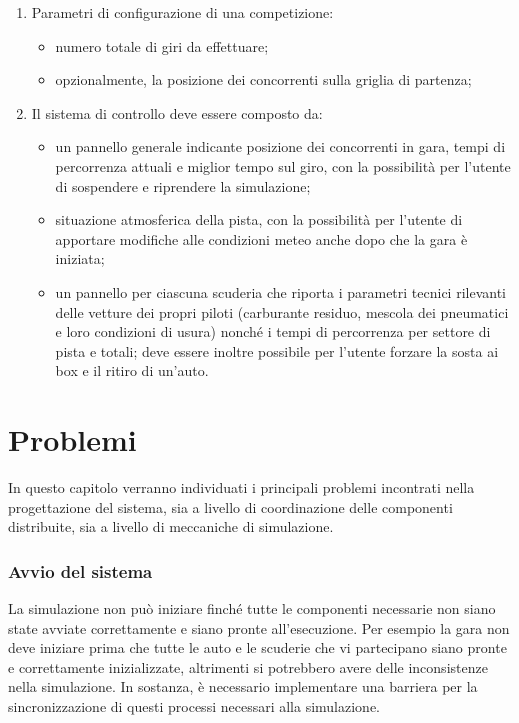 \documentclass[a4paper]{report}
\begin{document}
\begin{enumerate}
\item Parametri di configurazione di una competizione:
	\begin{itemize}
	\item numero totale di giri da effettuare;
	\item opzionalmente, la posizione dei concorrenti sulla griglia di partenza;
	\end{itemize}
\item Il sistema di controllo deve essere composto da:
	\begin{itemize}
	\item un pannello generale indicante posizione dei concorrenti in gara, tempi di percorrenza attuali e miglior tempo sul giro, con la possibilità per l'utente di sospendere e riprendere la simulazione;
	\item situazione atmosferica della pista, con la possibilità per l'utente di apportare modifiche alle condizioni meteo anche dopo che la gara è iniziata;
	\item un pannello per ciascuna scuderia che riporta i parametri tecnici rilevanti delle vetture dei propri piloti (carburante residuo, mescola dei pneumatici e loro condizioni di usura) nonché i tempi di percorrenza per settore di pista e totali; deve essere inoltre possibile per l'utente forzare la sosta ai box e il ritiro di un'auto.
	\end{itemize}
\end{enumerate}


\chapter{Problemi}

In questo capitolo verranno individuati i principali problemi incontrati nella progettazione del sistema, sia a livello di coordinazione delle componenti distribuite, sia a livello di meccaniche di simulazione.

\subsection*{Avvio del sistema}
La simulazione non può iniziare finché tutte le componenti necessarie non siano state avviate correttamente e siano pronte all'esecuzione. Per esempio la gara non deve iniziare prima che tutte le auto e le scuderie che vi partecipano siano pronte e correttamente inizializzate, altrimenti si potrebbero avere delle inconsistenze nella simulazione. In sostanza, è necessario implementare una barriera per la sincronizzazione di questi processi necessari alla simulazione.
\end{document}
